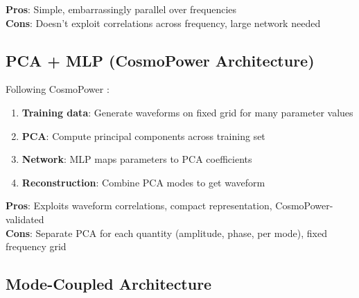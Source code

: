 \documentclass[11pt,a4paper]{article}
\newcommand{\Mf}{\mathcal{F}}
\begin{document}
\textbf{Pros}: Simple, embarrassingly parallel over frequencies \\
\textbf{Cons}: Doesn't exploit correlations across frequency, large network needed

\subsection{PCA + MLP (CosmoPower Architecture)}
\label{sec:arch_pca}

Following CosmoPower \cite{cosmopower}:

\begin{enumerate}
    \item \textbf{Training data}: Generate waveforms on fixed grid for many parameter values
    \item \textbf{PCA}: Compute principal components across training set
    \item \textbf{Network}: MLP maps parameters to PCA coefficients
    \item \textbf{Reconstruction}: Combine PCA modes to get waveform
\end{enumerate}

\begin{center}
\end{center}

\textbf{Pros}: Exploits waveform correlations, compact representation, CosmoPower-validated \\
\textbf{Cons}: Separate PCA for each quantity (amplitude, phase, per mode), fixed frequency grid

\subsection{Mode-Coupled Architecture}
\label{sec:arch_coupled}
\end{document}
